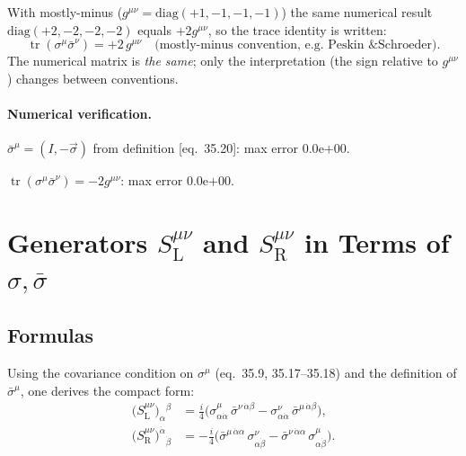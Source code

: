 \documentclass[12pt]{article}
\newcommand{\verified}[1]{\textcolor{verifygreen}{\checkmark\; #1}}
\begin{document}
\begin{metricnote}
With mostly-minus ($g^{\mu\nu}=\mathrm{diag}(+1,-1,-1,-1)$) the same
numerical result $\mathrm{diag}(+2,-2,-2,-2)$ equals $+2g^{\mu\nu}$,
so the trace identity is written:
\[
  \operatorname{tr}(\sigma^\mu\bar\sigma^\nu) = +2\,g^{\mu\nu}
  \quad\text{(mostly-minus convention, e.g.\ Peskin \& Schroeder).}
\]
The numerical matrix is \emph{the same}; only the interpretation (the
sign relative to $g^{\mu\nu}$) changes between conventions.
\end{metricnote}

\paragraph{Numerical verification.}
\verified{$\bar\sigma^{\mu} = (I,-\vec\sigma)$ from definition [eq.~35.20]: max error $0.0$\textrm{e}$+00$.}

\verified{$\operatorname{tr}(\sigma^\mu\bar\sigma^\nu) = -2g^{\mu\nu}$: max error $0.0$\textrm{e}$+00$.}

\section{Generators \texorpdfstring{$S^{\mu\nu}_{\mathrm{L}}$}{S\_L} and
         \texorpdfstring{$S^{\mu\nu}_{\mathrm{R}}$}{S\_R}
         in Terms of \texorpdfstring{$\sigma,\bar\sigma$}{sigma,sigmabar}
         \quad [eq.~35.21--35.22]}

\subsection{Formulas}

Using the covariance condition on $\sigma^\mu$ (eq.~35.9, 35.17--35.18)
and the definition of $\bar\sigma^\mu$, one derives the compact form:
\begin{align}
  \bigl(S^{\mu\nu}_{\mathrm{L}}\bigr)_\alpha{}^\beta
  &= \tfrac{i}{4}
    \bigl(\sigma^\mu_{\alpha\dot\alpha}\,\bar\sigma^{\nu\,\dot\alpha\beta}
         -\sigma^\nu_{\alpha\dot\alpha}\,\bar\sigma^{\mu\,\dot\alpha\beta}\bigr),
  \tag{35.21}\\[6pt]
  \bigl(S^{\mu\nu}_{\mathrm{R}}\bigr)^{\dot\alpha}{}_{\dot\beta}
  &= -\tfrac{i}{4}
    \bigl(\bar\sigma^{\mu\,\dot\alpha\alpha}\,\sigma^\nu_{\alpha\dot\beta}
         -\bar\sigma^{\nu\,\dot\alpha\alpha}\,\sigma^\mu_{\alpha\dot\beta}\bigr).
  \tag{35.22}
\end{align}
\end{document}
